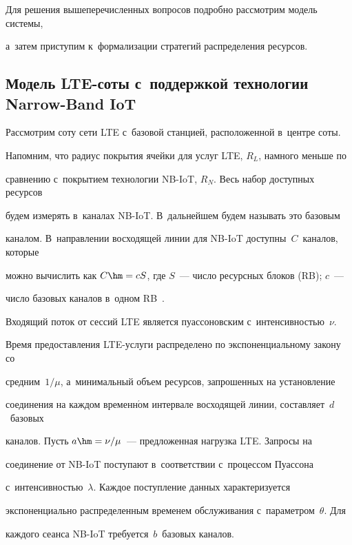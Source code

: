 Для решения вышеперечисленных вопросов подробно рассмотрим модель системы, 


а~затем приступим к~формализации стратегий распределения ресурсов.





\subsection{Модель LTE-соты с~поддержкой технологии Narrow-Band IoT}





Рассмотрим соту сети LTE с~базовой станцией, расположенной в~центре соты. 


Напомним, что радиус покрытия ячейки для услуг LTE, $R_L$, намного меньше по 


сравнению с~покрытием технологии NB-IoT, $R_N$. Весь набор доступных ресурсов 


будем измерять в~каналах NB-IoT. В~дальнейшем будем называть это базовым 


каналом. В~направлении восходящей линии для NB-IoT доступны~$C$~каналов, которые 


можно вычислить как $C \hm= cS$, где $S$~--- число ресурсных блоков (RB); $c$~--- 


число базовых каналов в~одном RB~\cite{BorodakiyBGS13}.





Входящий поток от сессий LTE является пуассоновским с~интенсивностью~$\nu$. 


Время предоставления LTE-услу\-ги распределено по экспоненциальному закону со 


средним~$1/\mu$, а~минимальный объем ресурсов, запрошенных на установление 


соединения на каждом временн$\acute{\mbox{о}}$м интервале восходящей линии, составляет~$d$~базовых 


каналов. Пусть $a\hm =\nu/\mu$~--- предложенная нагрузка LTE. Запросы на 


соединение от NB-IoT поступают в~соответствии с~процессом Пуассона 


с~интенсивностью~$\lambda$. Каждое поступление данных характеризуется 


экспоненциально распределенным временем обслуживания с~параметром~$\theta$. Для 


каждого сеанса NB-IoT требуется~$b$~базовых каналов.


